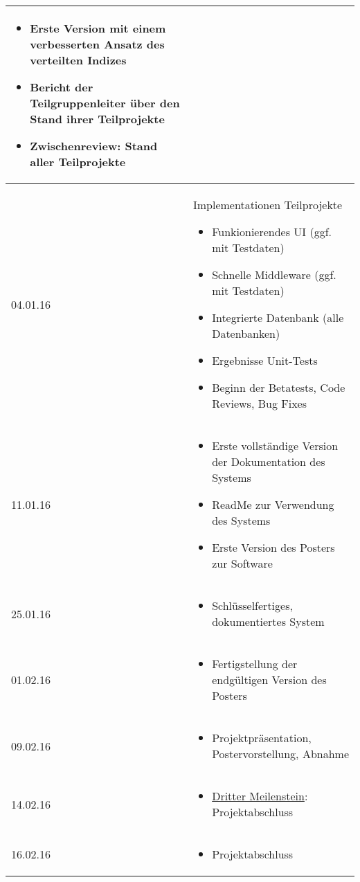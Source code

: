 \documentclass{scrartcl}
\begin{document}
\begin{longtable}{| l | p{14cm} |}
\begin{itemize}
 \item Erste Version mit einem verbesserten Ansatz des verteilten Indizes
 \item Bericht der Teilgruppenleiter über den Stand ihrer Teilprojekte
 \item Zwischenreview: Stand aller Teilprojekte 
\end{itemize}\\
\hline
04.01.16 & Implementationen Teilprojekte
\begin{itemize}
 \item Funkionierendes UI (ggf. mit Testdaten)
 \item Schnelle Middleware (ggf. mit Testdaten) 
 \item Integrierte Datenbank (alle Datenbanken)
 \item Ergebnisse Unit-Tests 
 \item Beginn der Betatests, Code Reviews, Bug Fixes
\end{itemize}\\
\hline
11.01.16 & \begin{itemize}
 \item Erste vollständige Version der Dokumentation des Systems
 \item ReadMe zur Verwendung des Systems
 \item Erste Version des Posters zur Software
\end{itemize}\\
\hline
25.01.16 & \begin{itemize}
 \item Schlüsselfertiges, dokumentiertes System 
\end{itemize}\\
\hline
01.02.16 & \begin{itemize}
 \item Fertigstellung der endgültigen Version des Posters
\end{itemize}\\
\hline
09.02.16 & \begin{itemize}
 \item Projektpräsentation, Postervorstellung, Abnahme
\end{itemize}\\
\hline
14.02.16 & \begin{itemize}
 \item \underline{Dritter Meilenstein}: Projektabschluss
\end{itemize}\\
\hline
16.02.16 & \begin{itemize}
 \item Projektabschluss
\end{itemize}\\
\hline
\end{longtable}
\end{document}
